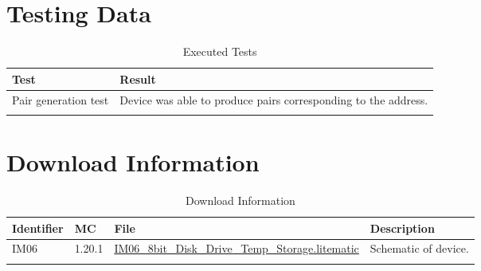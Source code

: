 \documentclass[10pt]{datasheet}
\begin{document}
\section{Testing Data}
\begin{table}[H]
\caption{Executed Tests}
\begin{tabularx}{\textwidth}{l | X}
    \thickhline
    \textbf{Test} & \textbf{Result} \\
    \hline
    Pair generation test & Device was able to produce pairs corresponding to the address. \\
    \thickhline
\end{tabularx}
\end{table}

\section{Download Information}
\begin{table}[H]
    \caption{Download Information}
    \begin{tabularx}{\textwidth}{l | l | l | X}
        \thickhline
        \textbf{Identifier} & \textbf{MC} & \textbf{File} & \textbf{Description} \\
        \hline
        IM06 & 1.20.1 & \href{https://github.com/Soontech-Annals/Archive/blob/8413f90a054b6c415703bae02badeba7541344f6/Archive/item-memory/IM06\%208bit\%20Disk\%20Drive\%20Temp\%20Storage/IM06\_8bit\_Disk\_Drive\_Temp\_Storage.litematic?raw=1}{IM06\_8bit\_Disk\_Drive\_Temp\_Storage.litematic} & Schematic of device. \\
        \hline
        \thickhline
    \end{tabularx}
\end{table}
\end{document}
